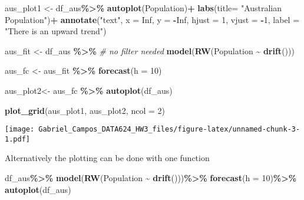 \documentclass[
]{article}
\newenvironment{Shaded}{\begin{snugshade}}{\end{snugshade}}
\newcommand{\AttributeTok}[1]{\textcolor[rgb]{0.13,0.29,0.53}{#1}}
\newcommand{\CommentTok}[1]{\textcolor[rgb]{0.56,0.35,0.01}{\textit{#1}}}
\newcommand{\ConstantTok}[1]{\textcolor[rgb]{0.56,0.35,0.01}{#1}}
\newcommand{\DecValTok}[1]{\textcolor[rgb]{0.00,0.00,0.81}{#1}}
\newcommand{\FunctionTok}[1]{\textcolor[rgb]{0.13,0.29,0.53}{\textbf{#1}}}
\newcommand{\NormalTok}[1]{#1}
\newcommand{\OtherTok}[1]{\textcolor[rgb]{0.56,0.35,0.01}{#1}}
\newcommand{\SpecialCharTok}[1]{\textcolor[rgb]{0.81,0.36,0.00}{\textbf{#1}}}
\newcommand{\StringTok}[1]{\textcolor[rgb]{0.31,0.60,0.02}{#1}}
\begin{document}
\begin{Shaded}
\begin{Highlighting}[]
\NormalTok{ aus\_plot1 }\OtherTok{\textless{}{-}}\NormalTok{ df\_aus}\SpecialCharTok{\%\textgreater{}\%}
  \FunctionTok{autoplot}\NormalTok{(Population)}\SpecialCharTok{+}
  \FunctionTok{labs}\NormalTok{(}\AttributeTok{title=} \StringTok{"Australian Population"}\NormalTok{)}\SpecialCharTok{+}
  \FunctionTok{annotate}\NormalTok{(}\StringTok{"text"}\NormalTok{, }\AttributeTok{x =} \ConstantTok{Inf}\NormalTok{, }\AttributeTok{y =} \SpecialCharTok{{-}}\ConstantTok{Inf}\NormalTok{, }\AttributeTok{hjust =} \DecValTok{1}\NormalTok{, }\AttributeTok{vjust =} \SpecialCharTok{{-}}\DecValTok{1}\NormalTok{,}
           \AttributeTok{label =} \StringTok{"There is an upward trend"}\NormalTok{)}

\NormalTok{aus\_fit }\OtherTok{\textless{}{-}}\NormalTok{ df\_aus }\SpecialCharTok{\%\textgreater{}\%}
            \CommentTok{\# no filter needed}
            \FunctionTok{model}\NormalTok{(}\FunctionTok{RW}\NormalTok{(Population }\SpecialCharTok{\textasciitilde{}} \FunctionTok{drift}\NormalTok{()))}

\NormalTok{aus\_fc }\OtherTok{\textless{}{-}}\NormalTok{ aus\_fit }\SpecialCharTok{\%\textgreater{}\%}
            \FunctionTok{forecast}\NormalTok{(}\AttributeTok{h =} \DecValTok{10}\NormalTok{)}

\NormalTok{aus\_plot2}\OtherTok{\textless{}{-}}\NormalTok{ aus\_fc }\SpecialCharTok{\%\textgreater{}\%} 
  \FunctionTok{autoplot}\NormalTok{(df\_aus)}



\FunctionTok{plot\_grid}\NormalTok{(aus\_plot1, aus\_plot2, }\AttributeTok{ncol =} \DecValTok{2}\NormalTok{)}
\end{Highlighting}
\end{Shaded}

\texttt{[image: Gabriel\_Campos\_DATA624\_HW3\_files/figure-latex/unnamed-chunk-3-1.pdf]}

Alternatively the plotting can be done with one function

\begin{Shaded}
\begin{Highlighting}[]
\NormalTok{df\_aus}\SpecialCharTok{\%\textgreater{}\%}
  \FunctionTok{model}\NormalTok{(}\FunctionTok{RW}\NormalTok{(Population }\SpecialCharTok{\textasciitilde{}} \FunctionTok{drift}\NormalTok{()))}\SpecialCharTok{\%\textgreater{}\%}
    \FunctionTok{forecast}\NormalTok{(}\AttributeTok{h =} \DecValTok{10}\NormalTok{)}\SpecialCharTok{\%\textgreater{}\%}
      \FunctionTok{autoplot}\NormalTok{(df\_aus)}
\end{Highlighting}
\end{Shaded}
\end{document}
